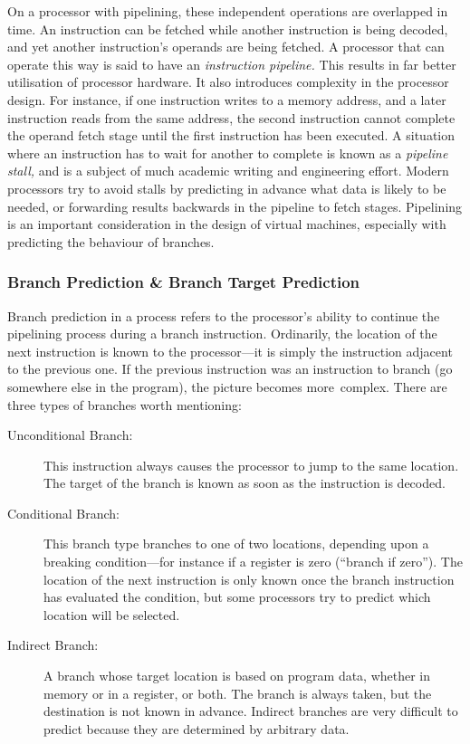 			On a processor with pipelining, these independent operations are overlapped in time. An instruction can be fetched while another instruction is being decoded, and yet another instruction's operands are being fetched. A processor that can operate this way is said to have an \emph{instruction pipeline.} This results in far better utilisation of processor hardware. It also introduces complexity in the processor design. For instance, if one instruction writes to a memory address, and a later instruction reads from the same address, the second instruction cannot complete the operand fetch stage until the first instruction has been executed. A situation where an instruction has to wait for another to complete is known as a \emph{pipeline stall,} and is a subject of much academic writing and engineering effort. Modern processors try to avoid stalls by predicting in advance what data is likely to be needed, or forwarding results backwards in the pipeline to fetch stages. Pipelining is an important consideration in the design of virtual machines, especially with predicting the behaviour of branches.
			
			\subsubsection{Branch Prediction \& Branch Target Prediction}
			Branch prediction in a process refers to the processor's ability to continue the pipelining process during a branch instruction. Ordinarily, the location of the next instruction is known to the processor---it is simply the instruction adjacent to the previous one. If the previous instruction was an instruction to branch (go somewhere else in the program), the picture becomes more~complex. There are three types of branches worth mentioning:
			\par\nobreak\makeatletter\@afterheading\makeatother
			\begin{description}
				\item[Unconditional Branch:] This instruction always causes the processor to jump to the same location. The target of the branch is known as soon as the instruction is decoded.
				\item[Conditional Branch:] This branch type branches to one of two locations, depending upon a breaking condition---for instance if a register is zero (``branch if zero''). The location of the next instruction is only known once the branch instruction has evaluated the condition, but some processors try to predict which location will be selected.
				\item[Indirect Branch:] A branch whose target location is based on program data, whether in memory or in a register, or both. The branch is always taken, but the destination is not known in advance. Indirect branches are very difficult to predict because they are determined by arbitrary data.
			\end{description}
			
